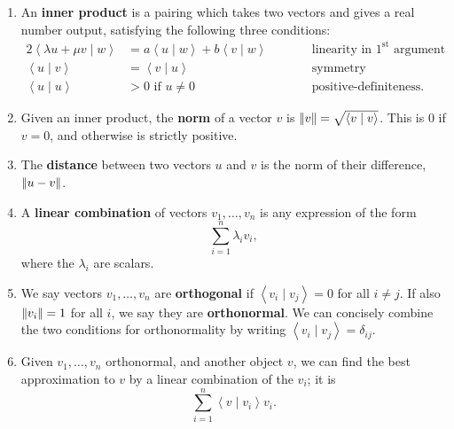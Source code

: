 \documentclass{article}
\newcommand{\norm}[1]{\left|\kern-1pt\left|#1\right|\kern-1pt\right|}
\newcommand{\braket}[2]{\left\langle #1 \mid #2 \right\rangle}
\begin{document}
\begin{enumerate}
	\item An \textbf{inner product} is a pairing which takes two vectors and gives a real number output, satisfying the following three conditions:
		\begin{alignat*}{2}
			\braket{\lambda u + \mu v}{w} &= a\braket{u}{w} + b\braket{v}{w}\qquad&& \mbox{linearity in $1^\mathrm{st}$ argument}\\
			\braket{u}{v} &= \braket{v}{u}\qquad&& \mbox{symmetry}\\
			\braket{u}{u} &> 0\mbox{ if $u\neq 0$}\qquad&& \mbox{positive-definiteness.}
		\end{alignat*}
	\item Given an inner product, the \textbf{norm} of a vector $v$ is $\norm{v}=\sqrt{\braket{v}{v}}$. This is 0 if $v=0$, and otherwise is strictly positive.
	\item The \textbf{distance} between two vectors $u$ and $v$ is the norm of their difference, $\norm{u-v}$.
	\item A \textbf{linear combination} of vectors $v_1,\hdots,v_n$ is any expression of the form
		\[\sum_{i=1}^n \lambda_i v_i,\]
		where the $\lambda_i$ are scalars.
	\item We say vectors $v_1,\hdots,v_n$ are \textbf{orthogonal} if $\braket{v_i}{v_j}=0$ for all $i\neq j$. If also $\norm{v_i}=1$ for all $i$, we say they are \textbf{orthonormal}. We can concisely combine the two conditions for orthonormality by writing $\braket{v_i}{v_j}=\delta_{ij}$.
	\item Given $v_1,\hdots,v_n$ orthonormal, and another object $v$, we can find the best approximation to $v$ by a linear combination of the $v_i$; it is
		\[\sum_{i=1}^n \braket{v}{v_i}v_i.\]
\end{enumerate}
\end{document}
